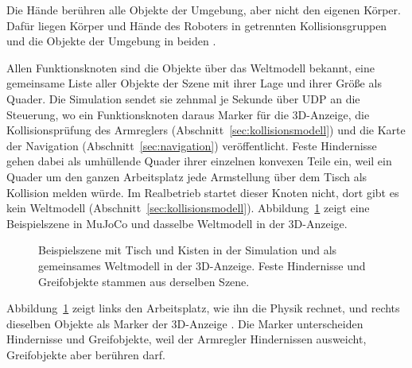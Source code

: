 Die Hände berühren alle Objekte der Umgebung, aber nicht den eigenen Körper.
Dafür liegen Körper und Hände des Roboters in getrennten Kollisionsgruppen und die Objekte der Umgebung in beiden \cite{MujocoDoku2026}.

Allen Funktionsknoten sind die Objekte über das Weltmodell bekannt, eine gemeinsame Liste aller Objekte der Szene mit ihrer Lage und ihrer Größe als Quader.
Die Simulation sendet sie zehnmal je Sekunde über UDP an die Steuerung, wo ein Funktionsknoten daraus Marker für die 3D-Anzeige, die Kollisionsprüfung des Armreglers (Abschnitt~\ref{sec:kollisionsmodell}) und die Karte der Navigation (Abschnitt~\ref{sec:navigation}) veröffentlicht.
Feste Hindernisse gehen dabei als umhüllende Quader ihrer einzelnen konvexen Teile ein, weil ein Quader um den ganzen Arbeitsplatz jede Armstellung über dem Tisch als Kollision melden würde.
Im Realbetrieb startet dieser Knoten nicht, dort gibt es kein Weltmodell (Abschnitt~\ref{sec:kollisionsmodell}).
Abbildung~\ref{fig:szene} zeigt eine Beispielszene in MuJoCo und dasselbe Weltmodell in der 3D-Anzeige.

\begin{figure}[htbp]
  \centering
  \caption[Beispielszene in Simulation und 3D-Anzeige]{Beispielszene mit Tisch und Kisten in der Simulation und als gemeinsames Weltmodell in der 3D-Anzeige. Feste Hindernisse und Greifobjekte stammen aus derselben Szene.}
  \label{fig:szene}
\end{figure}

Abbildung~\ref{fig:szene} zeigt links den Arbeitsplatz, wie ihn die Physik rechnet, und rechts dieselben Objekte als Marker der 3D-Anzeige .
Die Marker unterscheiden Hindernisse und Greifobjekte, weil der Armregler Hindernissen ausweicht, Greifobjekte aber berühren darf.

